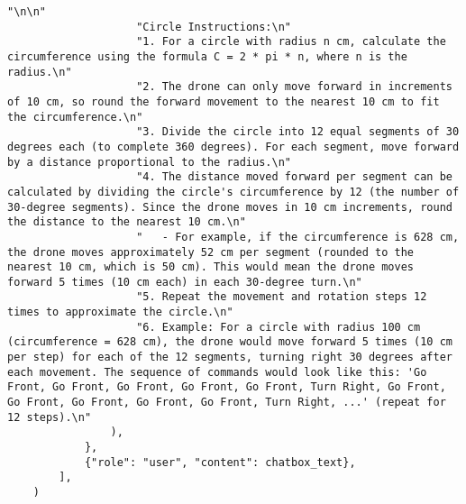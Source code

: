 \begin{lstlisting}[caption={Prompt Engineering Drone Command Generation}, label={lst:prompt_engineering}]
                    "\n\n"
                    "Circle Instructions:\n"
                    "1. For a circle with radius n cm, calculate the circumference using the formula C = 2 * pi * n, where n is the radius.\n"
                    "2. The drone can only move forward in increments of 10 cm, so round the forward movement to the nearest 10 cm to fit the circumference.\n"
                    "3. Divide the circle into 12 equal segments of 30 degrees each (to complete 360 degrees). For each segment, move forward by a distance proportional to the radius.\n"
                    "4. The distance moved forward per segment can be calculated by dividing the circle's circumference by 12 (the number of 30-degree segments). Since the drone moves in 10 cm increments, round the distance to the nearest 10 cm.\n"
                    "   - For example, if the circumference is 628 cm, the drone moves approximately 52 cm per segment (rounded to the nearest 10 cm, which is 50 cm). This would mean the drone moves forward 5 times (10 cm each) in each 30-degree turn.\n"
                    "5. Repeat the movement and rotation steps 12 times to approximate the circle.\n"
                    "6. Example: For a circle with radius 100 cm (circumference = 628 cm), the drone would move forward 5 times (10 cm per step) for each of the 12 segments, turning right 30 degrees after each movement. The sequence of commands would look like this: 'Go Front, Go Front, Go Front, Go Front, Go Front, Turn Right, Go Front, Go Front, Go Front, Go Front, Go Front, Turn Right, ...' (repeat for 12 steps).\n"
                ),
            },
            {"role": "user", "content": chatbox_text},
        ],
    )
    \end{lstlisting}
    
